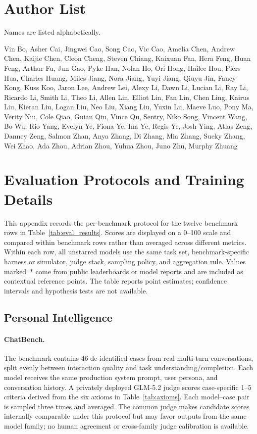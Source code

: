 \newpage
\section{Author List}
\label{app:author_list}

Names are listed alphabetically.

\begin{sloppypar}
Vin Bo, Asher Cai, Jingwei Cao, Song Cao, Vic Cao, Amelia Chen, Andrew Chen, Kaijie Chen, Cleon Cheng, Steven Chiang, Kaixuan Fan, Hera Feng, Huan Feng, Arthur Fu, Jun Gao, Pyke Han, Nolan Ho, Ori Hong, Hailee Hou, Piers Hua, Charles Huang, Miles Jiang, Nora Jiang, Yuyi Jiang, Qiuyu Jin, Fancy Kong, Kuss Koo, Jaron Lee, Andrew Lei, Alexy Li, Dawn Li, Lucian Li, Ray Li, Ricardo Li, Smith Li, Theo Li, Allen Lin, Elliot Lin, Fan Lin, Chen Ling, Kairus Liu, Kieran Liu, Logan Liu, Neo Liu, Xiang Liu, Yuxin Lu, Maeve Luo, Pony Ma, Verity Niu, Cole Qiao, Guian Qiu, Vince Qu, Sentry, Niko Song, Vincent Wang, Bo Wu, Rio Yang, Evelyn Ye, Fiona Ye, Ina Ye, Regis Ye, Josh Ying, Atlas Zeng, Danney Zeng, Salmon Zhan, Anya Zhang, Di Zhang, Mia Zhang, Sueky Zhang, Wei Zhao, Ada Zhou, Adrian Zhou, Yuhua Zhou, Juno Zhu, Murphy Zhuang
\end{sloppypar}

\section{Evaluation Protocols and Training Details}
\label{app:eval_protocols}

This appendix records the per-benchmark protocol for the twelve benchmark rows in Table~\ref{tab:eval_results}. Scores are displayed on a 0--100 scale and compared within benchmark rows rather than averaged across different metrics. Within each row, all unstarred models use the same task set, benchmark-specific harness or simulator, judge stack, sampling policy, and aggregation rule. Values marked~\(\ast\) come from public leaderboards or model reports and are included as contextual reference points. The table reports point estimates; confidence intervals and hypothesis tests are not available.

\subsection{Personal Intelligence}

\paragraph{ChatBench.} The benchmark contains 46 de-identified cases from real multi-turn conversations, split evenly between interaction quality and task understanding/completion. Each model receives the same production system prompt, user persona, and conversation history. A privately deployed GLM-5.2 judge scores case-specific 1--5 criteria derived from the six axioms in Table~\ref{tab:axioms}. Each model--case pair is sampled three times and averaged. The common judge makes candidate scores internally comparable under this protocol but may favor outputs from the same model family; no human agreement or cross-family judge calibration is available.

